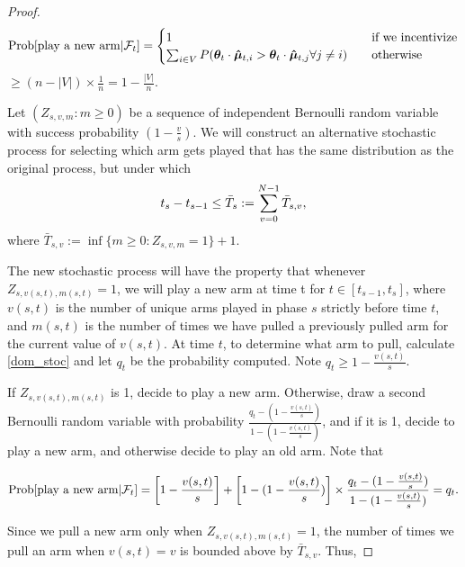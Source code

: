 \begin{proof}
\[ \Prob{\text{play a new arm}|\mathcal{F}_t} =
\begin{cases}
1       & \quad \text{if we incentivize}\\
\sum_{i\in V} P(\AgentV{t} \cdot \ArmEV{t}{i}>\AgentV{t}\cdot \ArmEV{t}{j} \forall j\neq i)  & \quad \text{otherwise}  
\end{cases} \label{dom_stoc}
\] 
\hspace{1cm}$\geq (n-|V|)\times \frac{1}{n}=1-\frac{|V|}{n}$.

Let $(Z_{s,v,m}:m\geq 0)$ be a sequence of independent Bernoulli random variable with success probability $(1-\frac{v}{s})$. We will construct an alternative stochastic process for selecting which arm gets played that has the same distribution as the original process, but under which
\begin{align}
t_{s}-t_{s-1}\leq \bar{T}_{s}:=\sum_{v=0}^{N-1}\bar{T}_{s,v}, \nonumber 
\end{align}
where $\bar{T}_{s,v}:=\inf\{m\geq 0: Z_{s,v,m}=1\}+1$.

The new stochastic process will have the property that whenever $Z_{s,v(s,t),m(s,t)}=1$, we will play a new arm at time t for $t\in [t_{s-1}, t_{s}]$, where $v(s,t)$ is the number of unique arms played in phase $s$ strictly before time $t$, and $m(s,t)$ is the number of times we have pulled a previously pulled arm for the current value of $v(s,t)$. At time $t$, to determine what arm to pull, calculate \eqref{dom_stoc} and let $q_t$ be the probability computed. Note $q_t\geq 1-\frac{v(s,t)}{s}$.

If $Z_{s,v(s,t),m(s,t)}$ is 1, decide to play a new arm. Otherwise, draw a second Bernoulli random variable with probability $\frac{q_t-(1-\frac{v(s,t)}{s})}{1-(1-\frac{v(s,t)}{s})}$, and if it is 1, decide to play a new arm, and otherwise decide to play an old arm. Note that

\begin{align}
\Prob{\text{play a new arm}|\mathcal{F}_{t}}=\left[1-\frac{v(s,t)}{s}\right]+\left[1-(1-\frac{v(s,t)}{s})\right]\times \frac{q_t-(1-\frac{v(s,t)}{s})}{1-(1-\frac{v(s,t)}{s})}=q_t.
\end{align}

Since we pull a new arm only when $Z_{s,v(s,t),m(s,t)}=1$, the number of times we pull an arm when $v(s,t)=v$ is bounded above by $\bar{T}_{s,v}$. Thus,


\end{proof}
